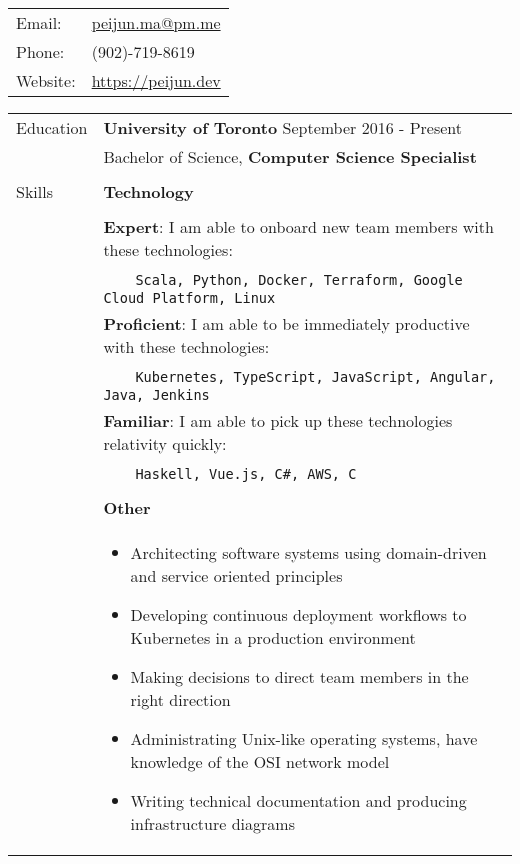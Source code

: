 \documentclass[letterpaper,12pt,oneside]{article}
\newcommand{\tabitem}{~~\llap{\textbullet}~~}
\begin{document}
\begin{tabular}{l l}
    Email: & \href{mailto:peijun.ma@pm.me}{peijun.ma@pm.me} \\
    Phone: & (902)-719-8619 \\
    Website: & \href{https://peijun.dev}{https://peijun.dev}
\end{tabular}

\noindent \begin{longtable}{@{} l p{14cm}}
\Large{Education} & \large{\textbf{University of Toronto}} September 2016 - Present\\
                  & Bachelor of Science, \textbf{Computer Science Specialist} \\
                  & \\
\Large{Skills}
& \large{\textbf{Technology}} \\
& \\
& \textbf{Expert}: I am able to onboard new team members with these technologies: \\
& \vspace{0.2cm} \tabitem \texttt{Scala, Python, Docker, Terraform, Google Cloud Platform, Linux} \\
& \textbf{Proficient}: I am able to be immediately productive with these technologies: \\
& \vspace{0.2cm} \tabitem \texttt{Kubernetes, TypeScript, JavaScript, Angular, Java, Jenkins} \\
& \textbf{Familiar}: I am able to pick up these technologies relativity quickly: \\
& \vspace{0.2cm} \tabitem \texttt{Haskell, Vue.js, C\#, AWS, C} \\
& \\
& \large{\textbf{Other}} \\
& \begin{itemize}[leftmargin=*,topsep=0pt,partopsep=0pt]
      \setlength\itemsep{0em}
      \item Architecting software systems using domain-driven and service oriented principles
      \item Developing continuous deployment workflows to Kubernetes in a production environment
      \item Making decisions to direct team members in the right direction
      \item Administrating Unix-like operating systems, have knowledge of the OSI network model
      \item Writing technical documentation and producing infrastructure diagrams

\end{itemize}
\end{longtable}
\end{document}

